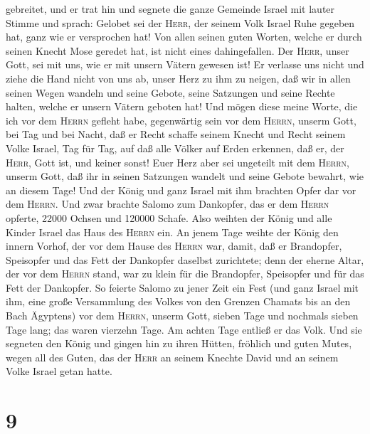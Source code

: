 gebreitet,  und er trat hin und segnete die ganze
Gemeinde Israel mit lauter Stimme und sprach:  Gelobet
sei der \textsc{Herr}, der seinem Volk Israel Ruhe gegeben hat, ganz wie
er versprochen hat! Von allen seinen guten Worten, welche er durch
seinen Knecht Mose geredet hat, ist nicht eines dahingefallen.
 Der \textsc{Herr}, unser Gott, sei mit uns, wie er mit
unsern Vätern gewesen ist! Er verlasse uns nicht und ziehe die Hand
nicht von uns ab,  unser Herz zu ihm zu neigen, daß wir
in allen seinen Wegen wandeln und seine Gebote, seine Satzungen und
seine Rechte halten, welche er unsern Vätern geboten hat!
 Und mögen diese meine Worte, die ich vor dem
\textsc{Herrn} gefleht habe, gegenwärtig sein vor dem \textsc{Herrn},
unserm Gott, bei Tag und bei Nacht, daß er Recht schaffe seinem Knecht
und Recht seinem Volke Israel, Tag für Tag,  auf daß alle
Völker auf Erden erkennen, daß er, der \textsc{Herr}, Gott ist, und
keiner sonst!  Euer Herz aber sei ungeteilt mit dem
\textsc{Herrn}, unserm Gott, daß ihr in seinen Satzungen wandelt und
seine Gebote bewahrt, wie an diesem Tage!  Und der König
und ganz Israel mit ihm brachten Opfer dar vor dem \textsc{Herrn}.
 Und zwar brachte Salomo zum Dankopfer, das er dem
\textsc{Herrn} opferte, 22000 Ochsen und 120000 Schafe. Also weihten der
König und alle Kinder Israel das Haus des \textsc{Herrn} ein.
 An jenem Tage weihte der König den innern Vorhof, der
vor dem Hause des \textsc{Herrn} war, damit, daß er Brandopfer,
Speisopfer und das Fett der Dankopfer daselbst zurichtete; denn der
eherne Altar, der vor dem \textsc{Herrn} stand, war zu klein für die
Brandopfer, Speisopfer und für das Fett der Dankopfer. 
So feierte Salomo zu jener Zeit ein Fest (und ganz Israel mit ihm, eine
große Versammlung des Volkes von den Grenzen Chamats bis an den Bach
Ägyptens) vor dem \textsc{Herrn}, unserm Gott, sieben Tage und nochmals
sieben Tage lang; das waren vierzehn Tage.  Am achten
Tage entließ er das Volk. Und sie segneten den König und gingen hin zu
ihren Hütten, fröhlich und guten Mutes, wegen all des Guten, das der
\textsc{Herr} an seinem Knechte David und an seinem Volke Israel getan
hatte.

\hypertarget{section-8}{%
\section{9}\label{section-8}}

